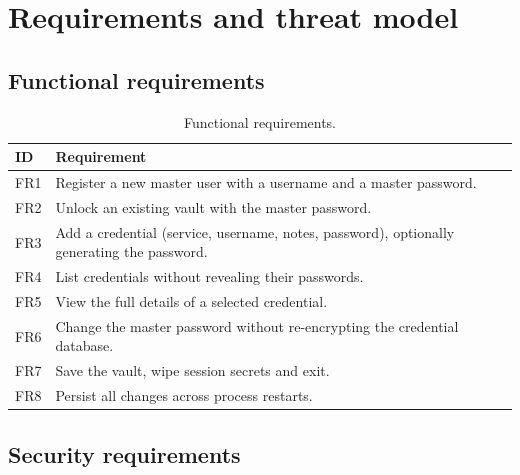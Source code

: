 \documentclass[11pt,a4paper]{article}
\begin{document}
\section{Requirements and threat model}\label{sec:requirements}

\subsection{Functional requirements}

\begin{table}[htbp]
\centering
\small
\begin{tabular}{@{}p{1.2cm}p{13.2cm}@{}}
\toprule
\textbf{ID} & \textbf{Requirement} \\
\midrule
FR1 & Register a new master user with a username and a master password. \\
FR2 & Unlock an existing vault with the master password. \\
FR3 & Add a credential (service, username, notes, password), optionally
      generating the password. \\
FR4 & List credentials without revealing their passwords. \\
FR5 & View the full details of a selected credential. \\
FR6 & Change the master password without re-encrypting the credential database. \\
FR7 & Save the vault, wipe session secrets and exit. \\
FR8 & Persist all changes across process restarts. \\
\bottomrule
\end{tabular}
\caption{Functional requirements.}
\label{tab:fr}
\end{table}

\subsection{Security requirements}
\end{document}
